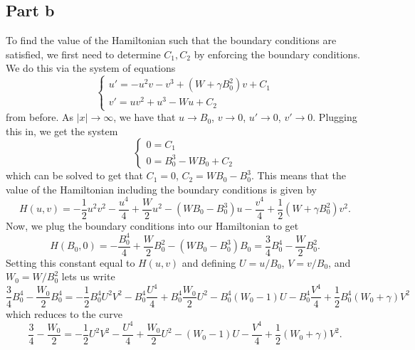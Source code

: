\documentclass{article}
\begin{document}
\subsection{Part b}
To find the value of the Hamiltonian such that the boundary conditions are satisfied, we first need to determine $C_1,C_2$ by enforcing the boundary conditions. We do this via the system of equations  
\[
\begin{cases}
	u'=-u^2v-v^3+(W+\gamma B_0^2)v+C_1\\
	v'=uv^2+u^3-Wu+C_2
\end{cases}
\]
from before. As $|x|\to\infty$, we have that $u\to B_0$, $v\to0$, $u'\to0$, $v'\to0$. Plugging this in, we get the system
\[
\begin{cases}
	0=C_1\\
	0=B_0^3-WB_0+C_2
\end{cases}
\]
which can be solved to get that $C_1=0$, $C_2=WB_0-B_0^3$. This means that the value of the Hamiltonian including the boundary conditions is given by
\[
H(u,v)=-\frac{1}{2} u^2v^2-\frac{u^4}{4}+\frac{W}{2}u^2-(WB_0-B_0^3)u-\frac{v^4}{4}+\frac{1}{2}(W+\gamma B_0^2)v^2.
\]
Now, we plug the boundary conditions into our Hamiltonian to get 
\[
H(B_0,0)=-\frac{B_0^4}{4}+\frac{W}{2}B_0^2-(WB_0-B_0^3)B_0=\frac{3}{4}B_0^4-\frac{W}{2}B_0^2.
\]
Setting this constant equal to $H(u,v)$ and defining $U=u/B_0$, $V=v/B_0$, and $W_0=W/B_0^2$ lets us write
\[
\frac{3}{4}B_0^4-\frac{W_0}{2}B_0^4=-\frac{1}{2} B_0^4U^2V^2-B_0^4\frac{U^4}{4}+B_0^4\frac{W_0}{2}U^2-B_0^4(W_0-1)U-B_0^4\frac{V^4}{4}+\frac{1}{2}B_0^4(W_0+\gamma)V^2
\]
which reduces to the curve
\[
\frac{3}{4}-\frac{W_0}{2}=-\frac{1}{2} U^2V^2-\frac{U^4}{4}+\frac{W_0}{2}U^2-(W_0-1)U-\frac{V^4}{4}+\frac{1}{2}(W_0+\gamma)V^2.
\]
\end{document}
